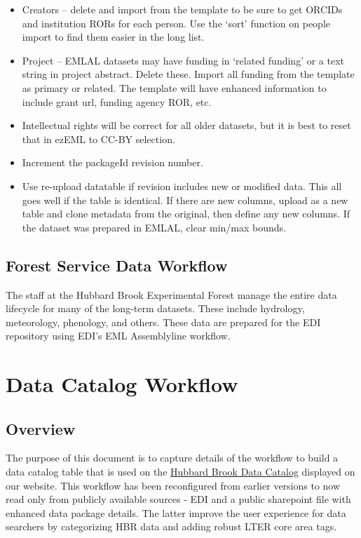 \documentclass[
  letterpaper,
  DIV=11,
  numbers=noendperiod]{scrreprt}
\providecommand{\tightlist}{%
  \setlength{\itemsep}{0pt}\setlength{\parskip}{0pt}}\usepackage{longtable,booktabs,array}
\begin{document}
\begin{itemize}
\tightlist
\item
  Creators -- delete and import from the template to be sure to get
  ORCIDs and institution RORs for each person. Use the `sort' function
  on people import to find them easier in the long list.
\item
  Project -- EMLAL datasets may have funding in `related funding' or a
  text string in project abstract. Delete these. Import all funding from
  the template as primary or related. The template will have enhanced
  information to include grant url, funding agency ROR, etc.
\item
  Intellectual rights will be correct for all older datasets, but it is
  best to reset that in ezEML to CC-BY selection.
\item
  Increment the packageId revision number.
\item
  Use re-upload datatable if revision includes new or modified data.
  This all goes well if the table is identical. If there are new
  columns, upload as a new table and clone metadata from the original,
  then define any new columns. If the dataset was prepared in EMLAL,
  clear min/max bounds.
\end{itemize}

\section{Forest Service Data
Workflow}\label{forest-service-data-workflow}

The staff at the Hubbard Brook Experimental Forest manage the entire
data lifecycle for many of the long-term datasets. These include
hydrology, meteorology, phenology, and others. These data are prepared
for the EDI repository using EDI's EML Assemblyline workflow.


\chapter{Data Catalog Workflow}\label{data-catalog-workflow}

\section{Overview}\label{overview-2}

The purpose of this document is to capture details of the workflow to
build a data catalog table that is used on the
\href{https://hubbardbrook.org/data-catalog}{Hubbard Brook Data Catalog}
displayed on our website. This workflow has been reconfigured from
earlier versions to now read only from publicly available sources - EDI
and a public sharepoint file with enhanced data package details. The
latter improve the user experience for data searchers by categorizing
HBR data and adding robust LTER core area tags.
\end{document}
